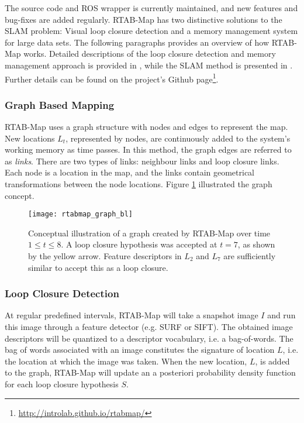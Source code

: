 The source code and \ac{ROS} wrapper is currently maintained, and new features and bug-fixes are added regularly. \ac{RTAB-Map} has two distinctive solutions to the \ac{SLAM} problem: Visual loop closure detection and a memory management system for large data sets. The following paragraphs provides an overview of how \ac{RTAB-Map} works. Detailed descriptions of the loop closure detection and memory management approach is provided in  \cite{labbe13appearance}, while the \ac{SLAM} method is presented in \cite{labbe14online}. Further details can be found on the project's Github page\footnote{\url{http://introlab.github.io/rtabmap/}}.

\subsubsection{Graph Based Mapping}

\ac{RTAB-Map} uses a graph structure with nodes and edges to represent the map. New locations $L_t$, represented by nodes, are continuously added to the system's working memory as time passes. In this method, the graph edges are referred to as \textit{links}. There are two types of links: neighbour links and loop closure links. Each node is a location in the map, and the links contain geometrical transformations between the node locations. Figure \ref{fig:rtabmap_graph} illustrated the graph concept.

\begin{figure}[h]
    \centering
    \texttt{[image: rtabmap\_graph\_bl]}
    \caption{Conceptual illustration of a graph created by \ac{RTAB-Map} over time $1 \leq t \leq 8 $. A loop closure hypothesis was accepted at $t=7$, as shown by the yellow arrow. Feature descriptors in $L_2$ and $L_7$ are sufficiently similar to accept this as a loop closure.}
    \label{fig:rtabmap_graph}
\end{figure}

\subsubsection{Loop Closure Detection}

At regular predefined intervals, \ac{RTAB-Map} will take a snapshot image $I$ and run this image through a feature detector (e.g. \ac{SURF} or \ac{SIFT}). The obtained image descriptors will be quantized to a descriptor vocabulary, i.e. a bag-of-words. The bag of words associated with an image constitutes the signature of location $L$, i.e. the location at which the image was taken. When the new location, $L$, is added to the graph, \ac{RTAB-Map} will update an a posteriori probability density function for each loop closure hypothesis $S$. 

